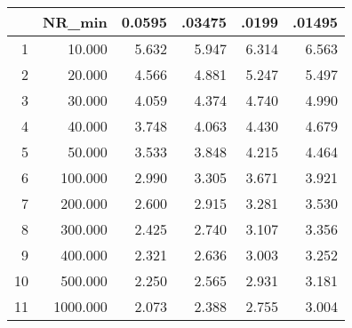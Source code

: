 \begin{table}[ht]
\centering
\begin{tabular}{rrrrrr}
  \hline
 & NR\_min & 0.0595 & .03475 & .0199 & .01495 \\ 
  \hline
1 & 10.000 & 5.632 & 5.947 & 6.314 & 6.563 \\ 
  2 & 20.000 & 4.566 & 4.881 & 5.247 & 5.497 \\ 
  3 & 30.000 & 4.059 & 4.374 & 4.740 & 4.990 \\ 
  4 & 40.000 & 3.748 & 4.063 & 4.430 & 4.679 \\ 
  5 & 50.000 & 3.533 & 3.848 & 4.215 & 4.464 \\ 
  6 & 100.000 & 2.990 & 3.305 & 3.671 & 3.921 \\ 
  7 & 200.000 & 2.600 & 2.915 & 3.281 & 3.530 \\ 
  8 & 300.000 & 2.425 & 2.740 & 3.107 & 3.356 \\ 
  9 & 400.000 & 2.321 & 2.636 & 3.003 & 3.252 \\ 
  10 & 500.000 & 2.250 & 2.565 & 2.931 & 3.181 \\ 
  11 & 1000.000 & 2.073 & 2.388 & 2.755 & 3.004 \\ 
   \hline
\end{tabular}
\end{table}
